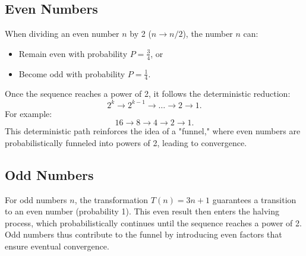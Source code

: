 \subsection{Even Numbers}
When dividing an even number \( n \) by 2 (\( n \to n/2 \)), the number \( n \) can:
\begin{itemize}
    \item Remain even with probability \( P = \frac{3}{4} \), or
    \item Become odd with probability \( P = \frac{1}{4} \).
\end{itemize}
Once the sequence reaches a power of 2, it follows the deterministic reduction:
\[
2^k \to 2^{k-1} \to \dots \to 2 \to 1.
\]
For example:
\[
16 \to 8 \to 4 \to 2 \to 1.
\]
This deterministic path reinforces the idea of a "funnel," where even numbers are probabilistically funneled into powers of 2, leading to convergence.

\subsection{Odd Numbers}
For odd numbers \( n \), the transformation \( T(n) = 3n + 1 \) guarantees a transition to an even number (probability 1). This even result then enters the halving process, which probabilistically continues until the sequence reaches a power of 2. Odd numbers thus contribute to the funnel by introducing even factors that ensure eventual convergence.


